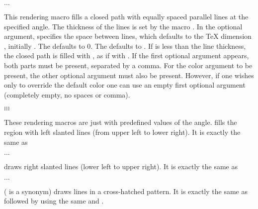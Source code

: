 \documentclass[letterpaper]{article}
\begin{document}
\begin{cd}
$\ldots$%
\end{cd}

This rendering macro fills a closed path with equally spaced parallel
lines at the specified angle. The thickness of the lines is set by the
macro . In the optional argument,  specifies
the space between lines, which defaults to the \TeX{} dimension
, initially \dim{3pt}. The  defaults to 0.
The  defaults to . If  is
less than the line thickness, the closed path is filled with
, as if with . If the first optional argument
appears, both parts must be present, separated by a comma. For the color
argument to be present, the other optional argument must also be
present. However, if one wishes only to override the default color one
can use an empty first optional argument (completely empty, no spaces or
comma).

\begin{cd}
$\ldots$\\
$\ldots$\\
$\ldots$\\
$\ldots$%
%
%
%
%
\end{cd}

These rendering macros are just  with predefined values of
the angle.  fills the region with left slanted lines (from
upper left to lower right). It is exactly the same as
\begin{display}
$\ldots$
\end{display}

 draws right slanted lines (lower left to upper right). It is
exactly the same as
\begin{display}
$\ldots$
\end{display}

 ( is a synonym) draws lines in a cross-hatched
pattern. It is exactly the same as  followed by 
using the same  and .
\end{document}
